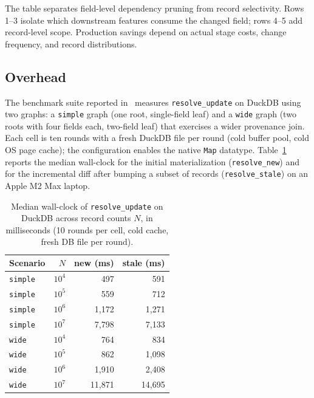 \documentclass[sigconf]{acmart}
\begin{document}
The table separates field-level dependency pruning from record selectivity.
Rows 1--3 isolate which downstream features consume the changed field; rows 4--5 add record-level scope.
Production savings depend on actual stage costs, change frequency, and record distributions.

\subsection{Overhead}
\label{sec:eval-overhead}

The benchmark suite reported in~\cite{gafni2026metaxyjoss} measures \texttt{resolve\_update} on DuckDB using two graphs: a \texttt{simple} graph (one root, single-field leaf) and a \texttt{wide} graph (two roots with four fields each, two-field leaf) that exercises a wider provenance join.
Each cell is ten rounds with a fresh DuckDB file per round (cold buffer pool, cold OS page cache); the configuration enables the native \texttt{Map} datatype.
Table~\ref{tab:overhead} reports the median wall-clock for the initial materialization (\texttt{resolve\_new}) and for the incremental diff after bumping a subset of records (\texttt{resolve\_stale}) on an Apple M2 Max laptop.

\begin{table}[t]
\centering
\caption{Median wall-clock of \texttt{resolve\_update} on DuckDB across record counts $N$, in milliseconds (10 rounds per cell, cold cache, fresh DB file per round).}
\label{tab:overhead}
\small
\begin{tabular}{@{}lrrr@{}}
\toprule
Scenario          & $N$        & new (ms) & stale (ms) \\
\midrule
\texttt{simple}   & $10^4$     & 497      & 591        \\
\texttt{simple}   & $10^5$     & 559      & 712        \\
\texttt{simple}   & $10^6$     & 1{,}172  & 1{,}271    \\
\texttt{simple}   & $10^7$     & 7{,}798  & 7{,}133    \\
\texttt{wide}     & $10^4$     & 764      & 834        \\
\texttt{wide}     & $10^5$     & 862      & 1{,}098    \\
\texttt{wide}     & $10^6$     & 1{,}910  & 2{,}408    \\
\texttt{wide}     & $10^7$     & 11{,}871 & 14{,}695   \\
\bottomrule
\end{tabular}
\end{table}
\end{document}
